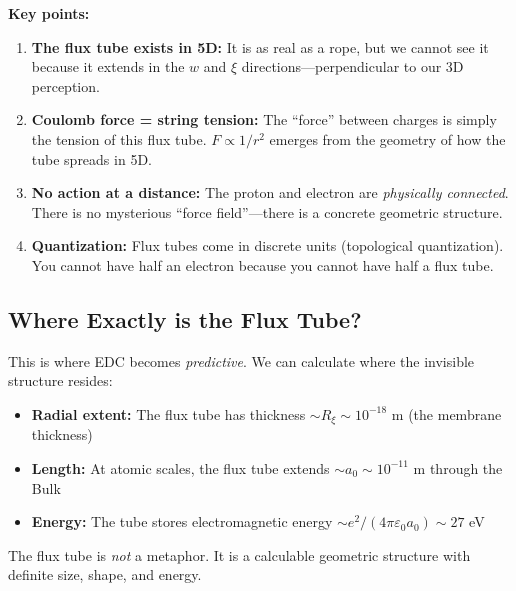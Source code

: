 \textbf{Key points:}

\begin{enumerate}
    \item \textbf{The flux tube exists in 5D:} It is as real as a rope, but we cannot see it because it extends in the $w$ and $\xi$ directions---perpendicular to our 3D perception.
    
    \item \textbf{Coulomb force = string tension:} The ``force'' between charges is simply the tension of this flux tube. $F \propto 1/r^2$ emerges from the geometry of how the tube spreads in 5D.
    
    \item \textbf{No action at a distance:} The proton and electron are \textit{physically connected}. There is no mysterious ``force field''---there is a concrete geometric structure.
    
    \item \textbf{Quantization:} Flux tubes come in discrete units (topological quantization). You cannot have half an electron because you cannot have half a flux tube.
\end{enumerate}

\subsection{Where Exactly is the Flux Tube?}
\label{subsec:flux_location}

This is where EDC becomes \textit{predictive}. We can calculate where the invisible structure resides:

\begin{itemize}
    \item \textbf{Radial extent:} The flux tube has thickness $\sim R_\xi \sim 10^{-18}$ m (the membrane thickness)
    
    \item \textbf{Length:} At atomic scales, the flux tube extends $\sim a_0 \sim 10^{-11}$ m through the Bulk
    
    \item \textbf{Energy:} The tube stores electromagnetic energy $\sim e^2/(4\pi\varepsilon_0 a_0) \sim 27$ eV
\end{itemize}

The flux tube is \textit{not} a metaphor. It is a calculable geometric structure with definite size, shape, and energy.


